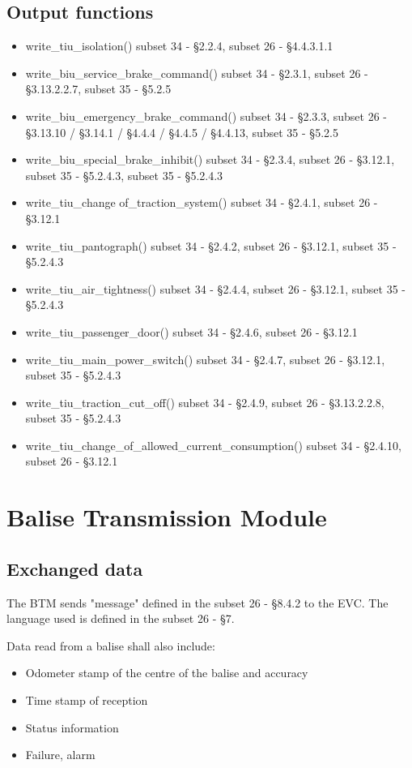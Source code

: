 \documentclass{template/openetcs_article}
\begin{document}
	\subsection{Output functions}
		\begin{itemize}
			\item write\_tiu\_isolation()
				\subitem subset 34 - §2.2.4, subset 26 - §4.4.3.1.1
			\item write\_biu\_service\_brake\_command()
				\subitem subset 34 - §2.3.1, subset 26 - §3.13.2.2.7, subset 35 - §5.2.5
			\item write\_biu\_emergency\_brake\_command()
				\subitem subset 34 - §2.3.3, subset 26 - §3.13.10 / §3.14.1 / §4.4.4 / §4.4.5 / §4.4.13, subset 35 - §5.2.5
			\item write\_biu\_special\_brake\_inhibit()
				\subitem subset 34 - §2.3.4, subset 26 - §3.12.1, subset 35 - §5.2.4.3, subset 35 - §5.2.4.3
			\item write\_tiu\_change of\_traction\_system()
				\subitem subset 34 - §2.4.1, subset 26 - §3.12.1
			\item write\_tiu\_pantograph()
				\subitem subset 34 - §2.4.2, subset 26 - §3.12.1, subset 35 - §5.2.4.3
			\item write\_tiu\_air\_tightness()
				\subitem subset 34 - §2.4.4, subset 26 - §3.12.1, subset 35 - §5.2.4.3
			\item write\_tiu\_passenger\_door()
				\subitem subset 34 - §2.4.6, subset 26 - §3.12.1
			\item write\_tiu\_main\_power\_switch()
				\subitem subset 34 - §2.4.7, subset 26 - §3.12.1, subset 35 - §5.2.4.3
			\item write\_tiu\_traction\_cut\_off()
				\subitem subset 34 - §2.4.9, subset 26 - §3.13.2.2.8, subset 35 - §5.2.4.3
			\item write\_tiu\_change\_of\_allowed\_current\_consumption()
				\subitem subset 34 - §2.4.10, subset 26 - §3.12.1		
		\end{itemize}
\section{Balise Transmission Module}
	\subsection{Exchanged data}
		The BTM sends "message" defined in the subset 26 - §8.4.2 to the EVC. The language used is defined in the subset 26 - §7.
		
		Data read from a balise shall also include:
		\begin{itemize}
			\item Odometer stamp of the centre of the balise and accuracy
			\item Time stamp of reception
			\item Status information
			\item Failure, alarm
		\end{itemize}
		
\end{document}
